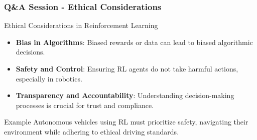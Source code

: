 \documentclass[aspectratio=169]{beamer}
\begin{document}
\begin{frame}[fragile]
    \frametitle{Q\&A Session - Ethical Considerations}
    \begin{block}{Ethical Considerations in Reinforcement Learning}
        \begin{itemize}
            \item \textbf{Bias in Algorithms}: Biased rewards or data can lead to biased algorithmic decisions.
            \item \textbf{Safety and Control}: Ensuring RL agents do not take harmful actions, especially in robotics.
            \item \textbf{Transparency and Accountability}: Understanding decision-making processes is crucial for trust and compliance.
        \end{itemize}
    \end{block}
    \begin{block}{Example}
        Autonomous vehicles using RL must prioritize safety, navigating their environment while adhering to ethical driving standards.
    \end{block}
\end{frame}
\end{document}
